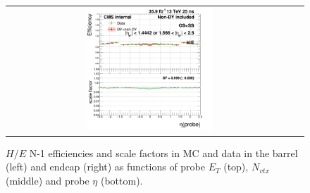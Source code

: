 \begin{figure}[bh]
\begin{center}
\begin{tabular}{cc}
      \includegraphics[width=0.45\textwidth]{figures/Zprime/2016/ScaleFactor/SameSign/N_1_eff/g_compare_cut_eta_Barrel+Endcap_ea_ta_inc_AS_N_1_HoE_PUW.png}
    \end{tabular}
    \caption{$H/E$ N-1 efficiencies and scale factors in MC and data in the barrel (left) and endcap (right) as functions of probe $E_T$ (top), $N_{vtx}$ (middle) and probe $\eta$ (bottom).}
    \label{fig:HoE_2016}
  \end{center}
\end{figure}

